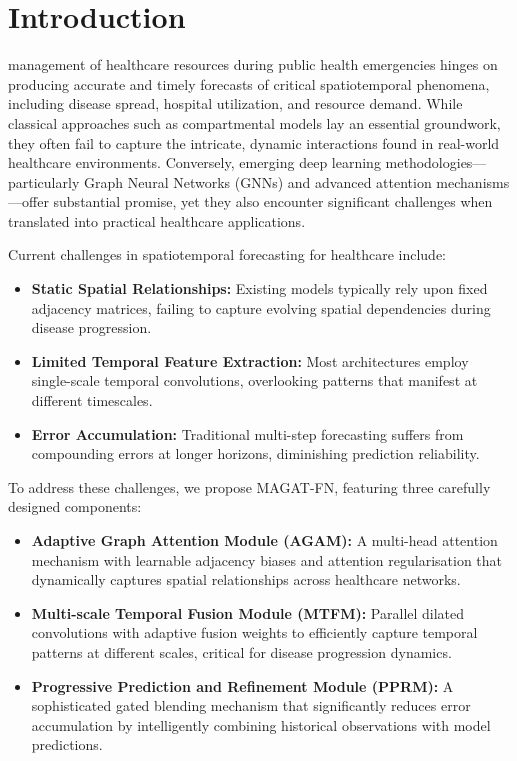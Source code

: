 \documentclass[lettersize, journal]{IEEEtran}
\begin{document}
\section{Introduction}

 management of healthcare resources during public health emergencies hinges on producing accurate and timely forecasts of critical spatiotemporal phenomena, including disease spread, hospital utilization, and resource demand. While classical approaches such as compartmental models \cite{compartmentalmodel} lay an essential groundwork, they often fail to capture the intricate, dynamic interactions found in real-world healthcare environments. Conversely, emerging deep learning methodologies—particularly Graph Neural Networks (GNNs) \cite{gnn_survey} and advanced attention mechanisms \cite{attention_mechanisms}—offer substantial promise, yet they also encounter significant challenges when translated into practical healthcare applications.

Current challenges in spatiotemporal forecasting for healthcare include:

\begin{itemize}
\item \textbf{Static Spatial Relationships:} Existing models typically rely upon fixed adjacency matrices, failing to capture evolving spatial dependencies during disease progression.
\item \textbf{Limited Temporal Feature Extraction:} Most architectures employ single-scale temporal convolutions, overlooking patterns that manifest at different timescales.
\item \textbf{Error Accumulation:} Traditional multi-step forecasting suffers from compounding errors at longer horizons, diminishing prediction reliability.
\end{itemize}

To address these challenges, we propose MAGAT-FN, featuring three carefully designed components:

\begin{itemize}
\item \textbf{Adaptive Graph Attention Module (AGAM):} A multi-head attention mechanism with learnable adjacency biases and attention regularisation that dynamically captures spatial relationships across healthcare networks.
\item \textbf{Multi-scale Temporal Fusion Module (MTFM):} Parallel dilated convolutions with adaptive fusion weights to efficiently capture temporal patterns at different scales, critical for disease progression dynamics.
\item \textbf{Progressive Prediction and Refinement Module (PPRM):} A sophisticated gated blending mechanism that significantly reduces error accumulation by intelligently combining historical observations with model predictions.
\end{itemize}
\end{document}
